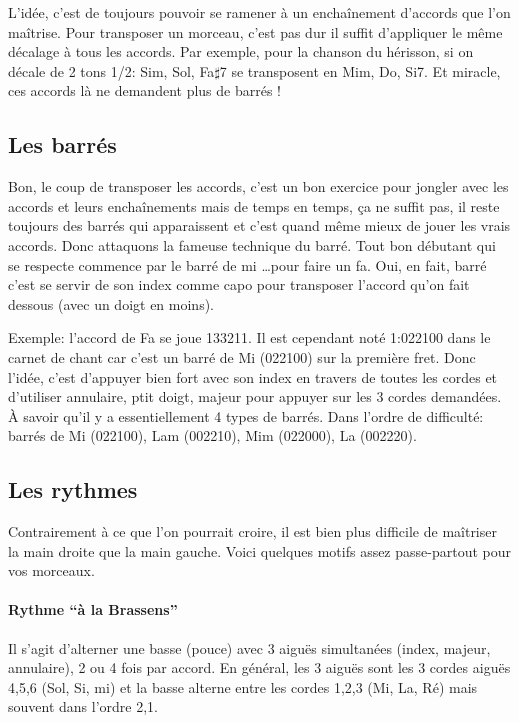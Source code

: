 \documentclass[a4paper]{article}
\begin{document}
L'idée, c'est de toujours pouvoir se ramener à un enchaînement
d'accords que l'on maîtrise.  Pour transposer un morceau, c'est pas
dur il suffit d'appliquer le même décalage à tous les accords.  Par
exemple, pour la chanson du hérisson, si on décale de 2 tons 1/2: Sim,
Sol, Fa$\sharp$7 se transposent en Mim, Do, Si7.  Et miracle, ces
accords là ne demandent plus de barrés !

\subsection{Les barrés}

Bon, le coup de transposer les accords, c'est un bon exercice pour
jongler avec les accords et leurs enchaînements mais de temps en
temps, ça ne suffit pas, il reste toujours des barrés qui apparaissent
et c'est quand même mieux de jouer les vrais accords. Donc attaquons
la fameuse technique du barré. Tout bon débutant qui se respecte
commence par le barré de mi \dots pour faire un fa. Oui, en fait,
barré c'est se servir de son index comme capo pour transposer l'accord
qu'on fait dessous (avec un doigt en moins).

Exemple: l'accord de Fa se joue 133211. Il est cependant noté 1:022100
dans le carnet de chant car c'est un barré de Mi (022100) sur la
première fret.  Donc l'idée, c'est d'appuyer bien fort avec son index
en travers de toutes les cordes et d'utiliser annulaire, ptit doigt,
majeur pour appuyer sur les 3 cordes demandées. À savoir qu'il y a
essentiellement 4 types de barrés.  Dans l'ordre de difficulté: barrés
de Mi (022100), Lam (002210), Mim (022000), La (002220).

\subsection{Les rythmes}

Contrairement à ce que l'on pourrait croire, il est bien plus
difficile de maîtriser la main droite que la main gauche.
Voici quelques motifs assez passe-partout pour vos morceaux.

\paragraph{Rythme ``à la Brassens''} Il s'agit d'alterner une basse (pouce)
avec 3 aiguës simultanées (index, majeur, annulaire), 2 ou 4 fois par
accord. En général, les 3 aiguës sont les 3 cordes aiguës 4,5,6 (Sol,
Si, mi) et la basse alterne entre les cordes 1,2,3 (Mi, La, Ré) mais
souvent dans l'ordre 2,1.
\end{document}
